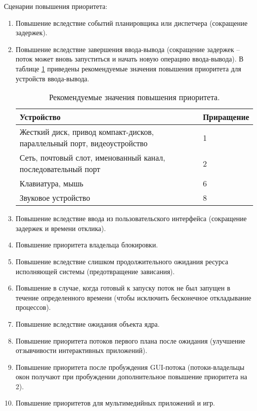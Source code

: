 Сценарии повышения приоритета:
\begin{enumerate}
	\item Повышение вследствие событий планировщика или диспетчера (сокращение задержек).
	\item Повышение вследствие завершения ввода-вывода (сокращение задержек -- поток может вновь запуститься и начать новую операцию ввода-вывода). В таблице \ref{tab:io} приведены рекомендуемые значения повышения приоритета для устройств ввода-вывода.
	\clearpage
	\begin{table}[h!]
		\caption{Рекомендуемые значения повышения приоритета.}
		\begin{center}
			\begin{tabular}{|p{100mm}|l|}
				\hline
				\textbf{Устройство} & \textbf{Приращение} \\
				\hline
				Жесткий диск, привод компакт-дисков, параллельный порт, видеоустройство & 1 \\
				\hline
				Сеть, почтовый слот, именованный канал, последовательный порт & 2 \\
				\hline
				Клавиатура, мышь & 6 \\
				\hline
				Звуковое устройство & 8 \\
				\hline
			\end{tabular}
		\end{center}
		\label{tab:io}
	\end{table}
	\item Повышение вследствие ввода из пользовательского интерфейса (сокращение задержек и времени отклика).
	\item Повышение приоритета владельца блокировки.
	\item Повышение вследствие слишком продолжительного ожидания ресурса исполняющей системы (предотвращение зависания).
	\item Повышение в случае, когда готовый к запуску поток не был запущен в течение определенного времени (чтобы исключить бесконечное откладывание процессов).
	\item Повышение вследствие ожидания объекта ядра.
	\item Повышение приоритета потоков первого плана после ожидания (улучшение отзывчивости интерактивных приложений).
	\item Повышение приоритета после пробуждения GUI-потока (потоки-владельцы окон получают при пробуждении дополнительное повышение приоритета на 2).
	\item Повышение приоритетов для мультимедийных приложений и игр.
\end{enumerate}

